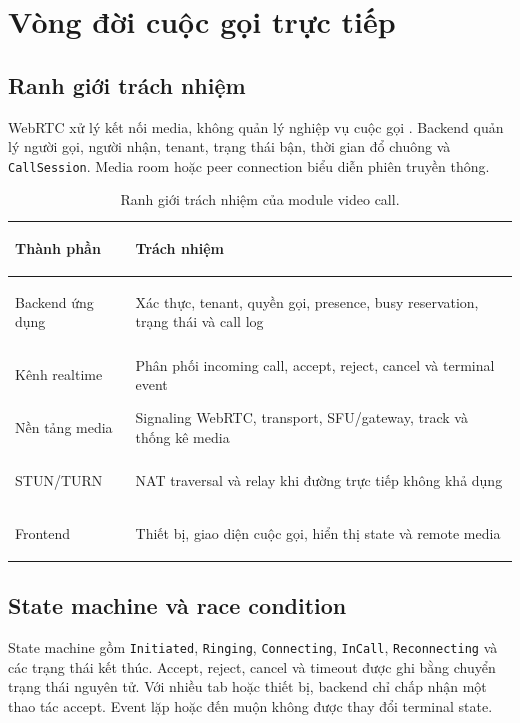 \section{Vòng đời cuộc gọi trực tiếp}

\subsection{Ranh giới trách nhiệm}

WebRTC xử lý kết nối media, không quản lý nghiệp vụ cuộc gọi \cite{rfc8825}. Backend quản
lý người gọi, người nhận, tenant, trạng thái bận, thời gian đổ chuông và
\texttt{CallSession}. Media room hoặc peer connection biểu diễn phiên truyền thông.

\begin{table}[htbp]
\centering
\small
\begin{tabularx}{\textwidth}{|>{\bfseries\raggedright\arraybackslash}p{}|>{\raggedright\arraybackslash}X|}
\hline
Thành phần & Trách nhiệm \\
\hline
Backend ứng dụng & Xác thực, tenant, quyền gọi, presence, busy reservation, trạng thái và call log \\
\hline
Kênh realtime & Phân phối incoming call, accept, reject, cancel và terminal event \\
\hline
Nền tảng media & Signaling WebRTC, transport, SFU/gateway, track và thống kê media \\
\hline
STUN/TURN & NAT traversal và relay khi đường trực tiếp không khả dụng \\
\hline
Frontend & Thiết bị, giao diện cuộc gọi, hiển thị state và remote media \\
\hline
\end{tabularx}
\caption{Ranh giới trách nhiệm của module video call.}
\label{tab:responsibility-boundary}
\end{table}

\subsection{State machine và race condition}

State machine gồm \texttt{Initiated}, \texttt{Ringing}, \texttt{Connecting},
\texttt{InCall}, \texttt{Reconnecting} và các trạng thái kết thúc. Accept, reject,
cancel và timeout được ghi bằng chuyển trạng thái nguyên tử. Với nhiều tab hoặc thiết bị,
backend chỉ chấp nhận một thao tác accept. Event lặp hoặc đến muộn không được thay đổi
terminal state.

